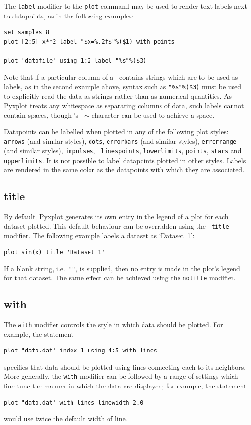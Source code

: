 The {\tt label} modifier to the {\tt plot} command may be used to render text 
labels next to datapoints, as in the following examples:
\begin{verbatim}
set samples 8
plot [2:5] x**2 label "$x=%.2f$"%($1) with points

plot 'datafile' using 1:2 label "%s"%($3)
\end{verbatim}

\noindent Note that if a particular column of a \datafile\ contains strings
which are to be used as labels, as in the second example above, syntax such as 
{\tt "\%s"\%(\$3)} must be used to explicitly read the data as strings rather
than as numerical quantities.  As Pyxplot treats any whitespace as separating
columns of data, such labels cannot contain spaces, though \latexdcf's {\tt
$\sim$} character can be used to achieve a space.

Datapoints can be labelled when plotted in any of the following plot styles:
{\tt arrows} (and similar styles), {\tt dots}, {\tt errorbars} (and similar
styles), {\tt errorrange} (and similar styles), {\tt impulses}, {\tt
linespoints}, {\tt lowerlimits}, {\tt points}, {\tt stars} and {\tt 
upperlimits}. It is not possible to label datapoints plotted in other styles.
Labels are rendered in the same color as the datapoints with which they are
associated.


\subsection{title}

By default, Pyxplot generates its own entry in the legend of a plot for each
dataset plotted.  This default behaviour can be overridden using the {\tt
title} modifier. The following example labels a dataset as `Dataset~1':

\begin{verbatim}
plot sin(x) title 'Dataset 1'
\end{verbatim}

\noindent If a blank string, i.e.\ {\tt ""}, is supplied, then no entry is made
in the plot's legend for that dataset. The same effect can be achieved using
the {\tt notitle} modifier.


\subsection{with}

The {\tt with} modifier controls the style in which data should be plotted. For
example, the statement
\begin{verbatim}
plot "data.dat" index 1 using 4:5 with lines
\end{verbatim}
specifies that data should be plotted using lines connecting each \datapoint to
its neighbors. More generally, the {\tt with} modifier can be followed by a
range of settings which fine-tune the manner in which the data are displayed;
for example, the statement
\begin{verbatim}
plot "data.dat" with lines linewidth 2.0
\end{verbatim}
would use twice the default width of line.

